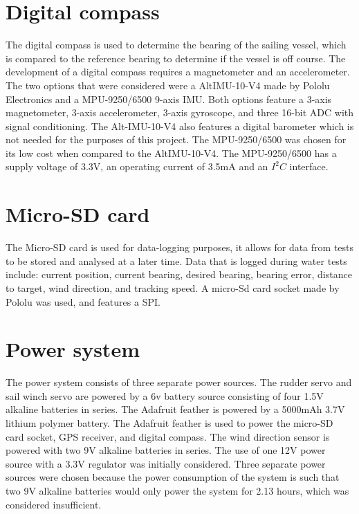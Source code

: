 \section{Digital compass}
The digital compass is used to determine the bearing of the sailing vessel, which is compared to the reference bearing to determine if the vessel is off course. 
The development of a digital compass requires a magnetometer and an accelerometer. The two options that were considered were a AltIMU-10-V4\cite{altimu-10} made by Pololu Electronics
and a MPU-9250/6500 9-axis IMU\cite{mpu-9250}. Both options feature a 3-axis magnetometer, 3-axis accelerometer, 3-axis gyroscope, and three 16-bit ADC with signal conditioning. The 
Alt-IMU-10-V4 also features a digital barometer which is not needed for the purposes of this project. The MPU-9250/6500 was chosen for its low cost when compared 
to the AltIMU-10-V4. The MPU-9250/6500 has a supply voltage of 3.3V, an operating current of 3.5mA and an $I^{2}C$ interface.


\section{Micro-SD card}
The Micro-SD card is used for data-logging purposes, it allows for data from tests to be stored and analysed at a later time. Data that is logged during water tests 
include: current position, current bearing, desired bearing, bearing error, distance to target, wind direction, and tracking speed. A micro-Sd card socket made 
by Pololu\cite{sd} was used, and features a SPI.  


\section{Power system}
The power system consists of three separate power sources. The rudder servo and sail winch servo are powered by a 6v battery source consisting of four 1.5V
alkaline batteries in series. The Adafruit feather is powered by a 5000mAh 3.7V lithium polymer battery. The Adafruit feather is used to power the micro-SD 
card socket, GPS receiver, and digital compass. The wind direction sensor is powered with two 9V alkaline batteries in series. The use of one 12V power source 
with a 3.3V regulator was initially considered. Three separate power sources were chosen because the power consumption of the system is such that two 9V alkaline
batteries would only power the system for 2.13 hours, which was considered insufficient.


